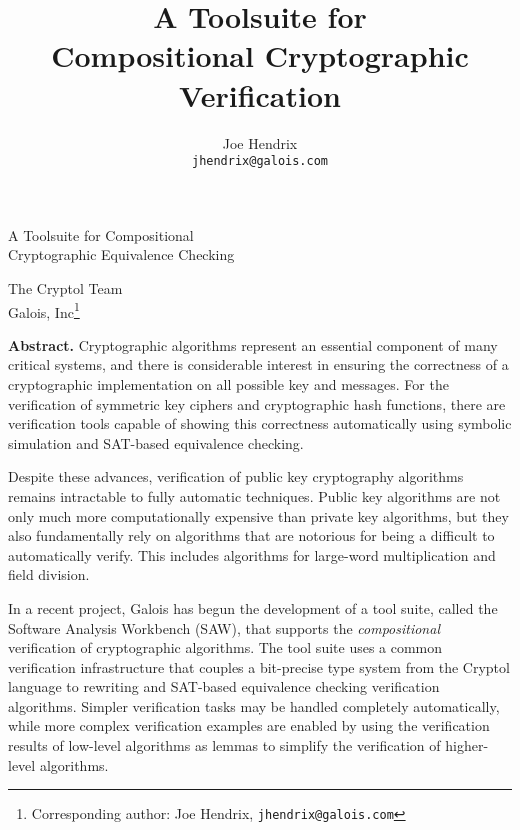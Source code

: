 \documentclass[12pt]{article}
\title{A Toolsuite for\\Compositional Cryptographic Verification}
\author{Joe Hendrix\\\texttt{jhendrix@galois.com}}
\begin{document}
\begin{center}
{\LARGE A Toolsuite for Compositional\\ Cryptographic Equivalence Checking}

\vspace{1.5em}

{\large The Cryptol Team}\\
{\large Galois, Inc\footnote{Corresponding author: Joe Hendrix, \texttt{jhendrix@galois.com}}}

\vspace{1.5em}

\end{center}

\noindent
\textbf{Abstract.}
Cryptographic algorithms represent an essential component of many critical
systems, and there is considerable interest in ensuring the correctness of a
cryptographic implementation on all possible key and messages.  For the
verification of symmetric key ciphers and cryptographic hash functions, there
are verification tools capable of showing this correctness automatically using
symbolic simulation and SAT-based equivalence checking.

Despite these advances, verification of public key cryptography algorithms
remains intractable to fully automatic techniques.  Public key algorithms are
not only much more computationally expensive than private key algorithms, but
they also fundamentally rely on algorithms that are notorious for being a
difficult to automatically verify.  This includes algorithms for
large-word multiplication and field division.

In a recent project, Galois has begun the development of a tool suite, called
the Software Analysis Workbench (SAW), that supports the \emph{compositional}
verification of cryptographic algorithms.  The tool suite uses a common
verification infrastructure that couples a bit-precise type system from the
Cryptol language to rewriting and SAT-based equivalence checking verification
algorithms.  Simpler verification tasks may be handled completely automatically,
while more complex verification examples are enabled by
using the verification results of low-level algorithms as lemmas to simplify
the verification of higher-level algorithms.

%
%
%
%
%
\end{document}
